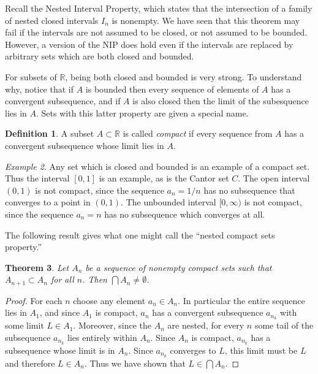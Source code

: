 \documentclass[11pt,oneside]{amsbook}
\newcommand{\R}{\mathbb R}
\theoremstyle{definition}
\theoremstyle{plain}
\newtheorem{thm}{Theorem}[section]
\theoremstyle{definition}
\newtheorem{defn}[thm]{Definition}
\theoremstyle{remark}
\newtheorem{example}[thm]{Example}
\numberwithin{equation}{section}
\numberwithin{figure}{section}
\begin{document}
Recall the Nested Interval Property, which states that the intersection of a family of nested closed intervals $I_n$ is nonempty. We have seen that this theorem may fail if the intervals are not assumed to be closed, or not assumed to be bounded. However, a version of the NIP does hold even if the intervals are replaced by arbitrary sets which are both closed and bounded.

For subsets of $\R$, being both closed and bounded is very strong. To understand why, notice that if $A$ is bounded then every sequence of elements of $A$ has a convergent subsequence, and if $A$ is also closed then the limit of the subesquence lies in $A$. Sets with this latter property are given a special name.

\begin{defn}
  A subset $A\subset\R$ is called \emph{compact} if every sequence from $A$ has a convergent subsequence whose limit lies in $A$.
\end{defn}

\begin{example}
  Any set which is closed and bounded is an example of a compact set. Thus the interval $[0,1]$ is an example, as is the Cantor set $C$. The open interval $(0,1)$ is not compact, since the sequence $a_n=1/n$ has no subsequence that converges to a point in $(0,1)$. The unbounded interval $[0,\infty)$ is not compact, since the sequence $a_n=n$ has no subsequence which converges at all.
\end{example}

The following result gives what one might call the ``nested compact sets property.''

\begin{thm}
  Let $A_n$ be a sequence of nonempty compact sets such that $A_{n+1}\subset A_n$ for all $n$. Then $\bigcap A_n\neq\emptyset$.
\end{thm}

\begin{proof}
  For each $n$ choose any element $a_n\in A_n$. In particular the entire sequence lies in $A_1$, and since $A_1$ is compact, $a_n$ has a convergent subsequence $a_{n_k}$ with some limit $L\in A_1$. Moreover, since the $A_n$ are nested, for every $n$ some tail of the subsequence $a_{n_k}$ lies entirely within $A_n$. Since $A_n$ is compact, $a_{n_k}$ has a subsequence whose limit is in $A_n$. Since $a_{n_k}$ converges to $L$, this limit must be $L$ and therefore $L\in A_n$. Thus we have shown that $L\in\bigcap A_n$.
\end{proof}
\end{document}
